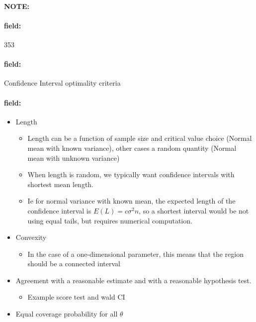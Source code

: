 \documentclass[12pt]{article}
\newenvironment{note}{\paragraph{NOTE:}}{}
\newenvironment{field}{\paragraph{field:}}{}
\begin{document}
\begin{note}
    \begin{field}
        \tiny 353
    \end{field}
    \begin{field}
        Confidence Interval optimality criteria
    \end{field}
    \begin{field}
        \begin{itemize}
          \item Length
          \begin{itemize}
            \item Length can be a function of sample size and critical value choice (Normal mean with known variance), other cases a random quantity (Normal mean with unknown variance)
            \item When length is random, we typically want confidence intervals with shortest mean length.
            \item Ie for normal variance with known mean, the expected length of the confidence interval is $E(L) = c \sigma^2 n$, so a shortest interval would be not using equal tails, but requires numerical computation.
          \end{itemize}
          \item Convexity
          \begin{itemize}
            \item In the case of a one-dimensional parameter, this means that the region should be a connected interval
          \end{itemize}
          \item Agreement with a reasonable estimate and with a reasonable hypothesis test.
          \begin{itemize}
            \item Example score test and wald CI
          \end{itemize}
          \item Equal coverage probability for all $\theta$
        \end{itemize}
    \end{field}
\end{note}
\end{document}
